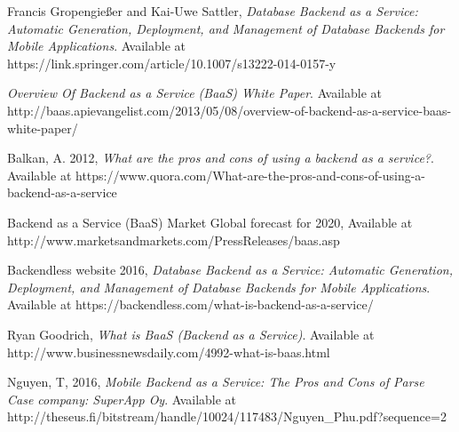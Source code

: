 \documentclass[a4paper,12pt]{report}
\begin{document}
    \renewcommand{\bibname}{References}
    \begin{thebibliography}{9}
    	Francis Gropengießer and Kai-Uwe Sattler,
      \emph{Database Backend as a Service: Automatic Generation, Deployment, and Management of Database Backends for Mobile Applications}.
			Available at https://link.springer.com/article/10.1007/s13222-014-0157-y
			
      \emph{Overview Of Backend as a Service (BaaS) White Paper}.
			Available at http://baas.apievangelist.com/2013/05/08/overview-of-backend-as-a-service-baas-white-paper/
			
								
			Balkan, A. 2012,
      \emph{What are the pros and cons of using a backend as a service?}.
			Available at https://www.quora.com/What-are-the-pros-and-cons-of-using-a-backend-as-a-service
		
			Backend as a Service (BaaS) Market Global forecast for 2020,
			Available at http://www.marketsandmarkets.com/PressReleases/baas.asp		
		
			Backendless website 2016,
      \emph{Database Backend as a Service: Automatic Generation, Deployment, and Management of Database Backends for Mobile Applications}.
			Available at https://backendless.com/what-is-backend-as-a-service/
	

			Ryan Goodrich,
      \emph{What is BaaS (Backend as a Service)}.
			Available at http://www.businessnewsdaily.com/4992-what-is-baas.html	
			
			Nguyen, T, 2016,
      \emph{Mobile Backend as a Service: The Pros and Cons of Parse
			Case company: SuperApp Oy}.
			Available at http://theseus.fi/bitstream/handle/10024/117483/Nguyen{\_}Phu.pdf?sequence=2
		
		\end{thebibliography}	
    
\end{document}
